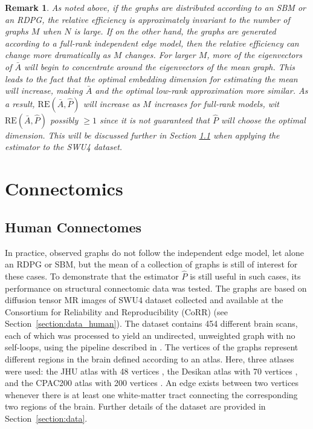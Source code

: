 \documentclass[journal,twoside,web]{ieeecolor}
\newtheorem{remark}[fact]{Remark}
\begin{document}
\begin{remark}\label{remark:low_rank}
As noted above, if the graphs are distributed according to an SBM or an RDPG, the relative efficiency is approximately invariant to the number of graphs $M$ when $N$ is large.
If on the other hand, the graphs are generated according to a full-rank independent edge model, then the relative efficiency can change more dramatically as $M$ changes.
For larger $M$, more of the eigenvectors of $\bar{A}$ will begin to concentrate around the eigenvectors of the mean graph.
This leads to the fact that the optimal embedding dimension for estimating the mean will increase, making $\bar{A}$ and the optimal low-rank approximation more similar.
As a result, $\mathrm{RE}(\bar{A},\hat{P})$ will increase as $M$ increases for full-rank models, wit $\mathrm{RE}(\bar{A},\hat{P})$ possibly $\geq 1$ since it is not guaranteed that $\hat{P}$ will choose the optimal dimension.
This will be discussed further in Section \ref{sec:corr_data} when applying the estimator to the SWU4 dataset.
\end{remark}

\section{Connectomics}\label{sec:connectome}

\subsection{Human Connectomes}\label{sec:corr_data}
In practice, observed graphs do not follow the independent edge model, let alone an RDPG or SBM, but the mean of a collection of graphs is still of interest for these cases.
To demonstrate that the estimator $\hat{P}$ is still useful in such cases, its performance on structural connectomic data was tested.
The graphs are based on diffusion tensor MR images of SWU4 dataset collected and available at the Consortium for Reliability and Reproducibility (CoRR) \cite{zuo2014open} (see Section~\ref{section:data_human}).
The dataset contains 454 different brain scans, each of which was processed to yield an undirected, unweighted graph with no self-loops, using the pipeline described in \cite{kiar2017science, kiar2016ndmg}.
The vertices of the graphs represent different regions in the brain defined according to an atlas.
Here, three atlases were used: the JHU atlas with 48 vertices \cite{oishi2010mri}, the Desikan atlas with 70 vertices \cite{desikan2006automated}, and the  CPAC200 atlas with 200 vertices \cite{sikka2014towards}.
An edge exists between two vertices whenever there is at least one white-matter tract connecting the corresponding two regions of the brain.
Further details of the dataset are provided in Section~\ref{section:data}.
\end{document}

